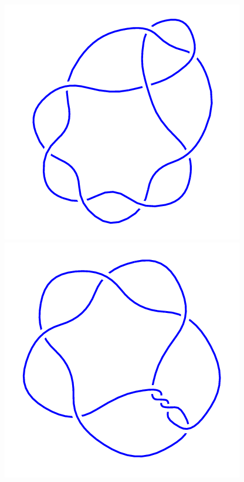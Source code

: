 \begin{figure}[H]
    \begin{minipage}[b]{.18\linewidth}
        \centering
        \includegraphics[width=\linewidth]{../data/8_2.png}
    \end{minipage}
    \begin{minipage}[b]{.18\linewidth}
        \centering
        \includegraphics[width=\linewidth]{../data/8_3.png}

\end{minipage}
\end{figure}
